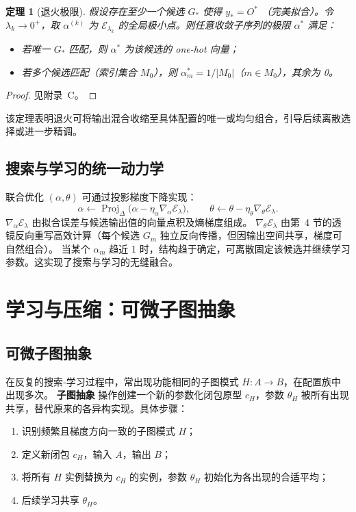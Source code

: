 \documentclass{ctexart}
\newtheorem{theorem}{定理}[section]
\DeclareMathOperator{\Proj}{Proj}
\begin{document}
\begin{theorem}[退火极限]
假设存在至少一个候选 $G_*$ 使得 $y_{*}=O^*$ （完美拟合）。令 $\lambda_k\to 0^+$，取 $\alpha^{(k)}$ 为 $\mathcal{E}_{\lambda_k}$ 的全局极小点。则任意收敛子序列的极限 $\alpha^*$ 满足：
\begin{itemize}
    \item 若唯一 $G_*$ 匹配，则 $\alpha^*$ 为该候选的 one-hot 向量；
    \item 若多个候选匹配（索引集合 $M_0$），则 $\alpha^*_m = 1/|M_0|$（$m\in M_0$），其余为 0。
\end{itemize}
\end{theorem}
\begin{proof}
见附录~C。
\end{proof}

该定理表明退火可将输出混合收缩至具体配置的唯一或均匀组合，引导后续离散选择或进一步精调。

\subsection{搜索与学习的统一动力学}

联合优化 $(\alpha,\theta)$ 可通过投影梯度下降实现：
\[
\alpha \leftarrow \Proj_\Delta\big(\alpha - \eta_\alpha \nabla_\alpha \mathcal{E}_\lambda\big),\qquad
\theta \leftarrow \theta - \eta_\theta \nabla_\theta \mathcal{E}_\lambda.
\]
$\nabla_\alpha \mathcal{E}_\lambda$ 由拟合误差与候选输出值的向量点积及熵梯度组成。  
$\nabla_\theta \mathcal{E}_\lambda$ 由第~4 节的透镜反向重写高效计算（每个候选 $G_m$ 独立反向传播，但因输出空间共享，梯度可自然组合）。  
当某个 $\alpha_m$ 趋近 1 时，结构趋于确定，可离散固定该候选并继续学习参数。这实现了搜索与学习的无缝融合。

\section{学习与压缩：可微子图抽象}

\subsection{可微子图抽象}

在反复的搜索‑学习过程中，常出现功能相同的子图模式 $H: A \to B$，在配置族中出现多次。  
\textbf{子图抽象} 操作创建一个新的参数化闭包原型 $c_H$，参数 $\theta_H$ 被所有出现共享，替代原来的各异构实现。具体步骤：
\begin{enumerate}
    \item 识别频繁且梯度方向一致的子图模式 $H$；
    \item 定义新闭包 $c_H$，输入 $A$，输出 $B$；
    \item 将所有 $H$ 实例替换为 $c_H$ 的实例，参数 $\theta_H$ 初始化为各出现的合适平均；
    \item 后续学习共享 $\theta_H$。
\end{enumerate}
\end{document}
